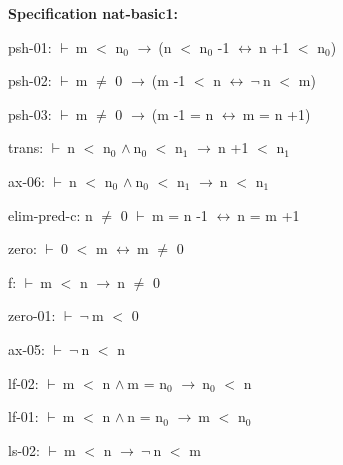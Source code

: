\documentclass[a4paper]{article}
\newcommand{\Fol}{\mbox{$\vdash\ $}}
\newcommand{\Not}{\mbox{$\neg\ $}}
\newcommand{\And}{\mbox{$\wedge\ $}}
\newcommand{\Imp}{\mbox{$\rightarrow\ $}}
\newcommand{\Equiv}{\mbox{$\leftrightarrow\ $}}
\begin{document}
{\bf Specification nat-basic1:}

psh-01: 
 \Fol m $<$ $\mbox{n}_{0}$ \Imp (n $<$ $\mbox{n}_{0}$ -1 \Equiv n +1 $<$ $\mbox{n}_{0}$)



psh-02: 
 \Fol m $\neq$ 0 \Imp (m -1 $<$ n \Equiv \Not n $<$ m)



psh-03: 
 \Fol m $\neq$ 0 \Imp (m -1 = n \Equiv m = n +1)



trans: 
 \Fol n $<$ $\mbox{n}_{0}$ \And $\mbox{n}_{0}$ $<$ $\mbox{n}_{1}$ \Imp n +1 $<$ $\mbox{n}_{1}$



ax-06: 
 \Fol n $<$ $\mbox{n}_{0}$ \And $\mbox{n}_{0}$ $<$ $\mbox{n}_{1}$ \Imp n $<$ $\mbox{n}_{1}$



elim-pred-c: 
n $\neq$ 0
 \Fol m = n -1 \Equiv n = m +1



zero: 
 \Fol 0 $<$ m \Equiv m $\neq$ 0



f: 
 \Fol m $<$ n \Imp n $\neq$ 0



zero-01: 
 \Fol \Not m $<$ 0



ax-05: 
 \Fol \Not n $<$ n



lf-02: 
 \Fol m $<$ n \And m = $\mbox{n}_{0}$ \Imp $\mbox{n}_{0}$ $<$ n



lf-01: 
 \Fol m $<$ n \And n = $\mbox{n}_{0}$ \Imp m $<$ $\mbox{n}_{0}$



ls-02: 
 \Fol m $<$ n \Imp \Not n $<$ m
\end{document}
